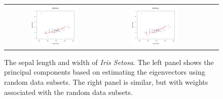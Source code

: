 \documentclass[ss]{imsart}
\theoremstyle{Example}
\begin{document}
 \begin{figure}
\begin{center}
\begin{tabular}{cccc}
\includegraphics[width=0.49\textwidth]{./RobustPCA_Figures/Iris_Sepal_PCA_Out_RP0} &
\includegraphics[width=0.49\textwidth]{./RobustPCA_Figures/Iris_Sepal_PCA_Out_RP1} 
\end{tabular}
\end{center}
\caption{The sepal length and width of \textit{Iris Setosa}. The left panel shows the principal components based on estimating the eigenvectors using random data subsets. 
The right panel is similar, but with weights associated with the random data subsets. }
\label{Figure:RP_PCA}
\end{figure}
\end{document}
